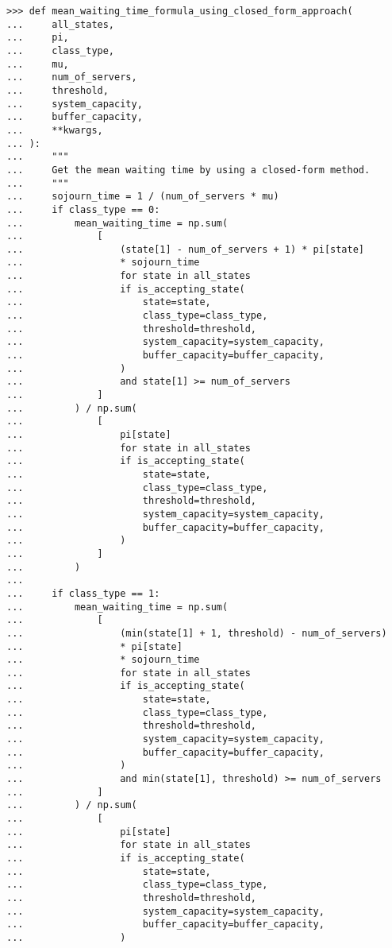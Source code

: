 \begin{lstlisting}[style=pystyle]
>>> def mean_waiting_time_formula_using_closed_form_approach(
...     all_states,
...     pi,
...     class_type,
...     mu,
...     num_of_servers,
...     threshold,
...     system_capacity,
...     buffer_capacity,
...     **kwargs,
... ):
...     """
...     Get the mean waiting time by using a closed-form method.
...     """
...     sojourn_time = 1 / (num_of_servers * mu)
...     if class_type == 0:
...         mean_waiting_time = np.sum(
...             [
...                 (state[1] - num_of_servers + 1) * pi[state]
...                 * sojourn_time
...                 for state in all_states
...                 if is_accepting_state(
...                     state=state,
...                     class_type=class_type,
...                     threshold=threshold,
...                     system_capacity=system_capacity,
...                     buffer_capacity=buffer_capacity,
...                 )
...                 and state[1] >= num_of_servers
...             ]
...         ) / np.sum(
...             [
...                 pi[state]
...                 for state in all_states
...                 if is_accepting_state(
...                     state=state,
...                     class_type=class_type,
...                     threshold=threshold,
...                     system_capacity=system_capacity,
...                     buffer_capacity=buffer_capacity,
...                 )
...             ]
...         )
...
...     if class_type == 1:
...         mean_waiting_time = np.sum(
...             [
...                 (min(state[1] + 1, threshold) - num_of_servers)
...                 * pi[state]
...                 * sojourn_time
...                 for state in all_states
...                 if is_accepting_state(
...                     state=state,
...                     class_type=class_type,
...                     threshold=threshold,
...                     system_capacity=system_capacity,
...                     buffer_capacity=buffer_capacity,
...                 )
...                 and min(state[1], threshold) >= num_of_servers
...             ]
...         ) / np.sum(
...             [
...                 pi[state]
...                 for state in all_states
...                 if is_accepting_state(
...                     state=state,
...                     class_type=class_type,
...                     threshold=threshold,
...                     system_capacity=system_capacity,
...                     buffer_capacity=buffer_capacity,
...                 )

\end{lstlisting}
